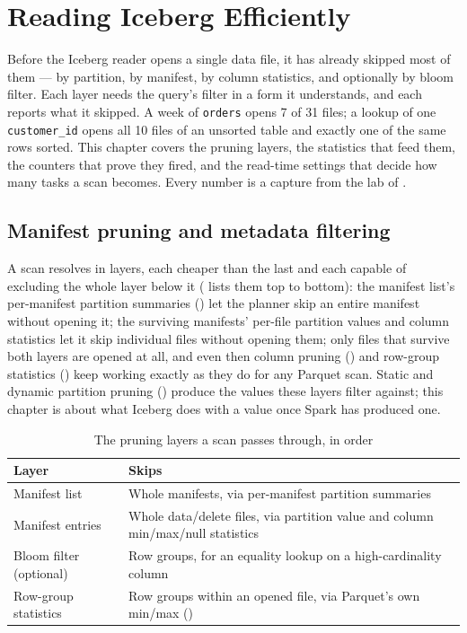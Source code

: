 \chapter{Reading Iceberg Efficiently}
\label{ch:iceberg-read}

\begin{chapterintro}
Before the Iceberg reader opens a single data file, it has already skipped most
of them --- by partition, by manifest, by column statistics, and optionally by
bloom filter. Each layer needs the query's filter in a form it understands, and
each reports what it skipped. A week of \texttt{orders} opens 7 of 31 files; a
lookup of one \texttt{customer\_id} opens all 10 files of an unsorted table and
exactly one of the same rows sorted. This chapter covers the pruning layers, the
statistics that feed them, the counters that prove they fired, and the read-time
settings that decide how many tasks a scan becomes. Every number is a capture
from the lab of .
\end{chapterintro}

\section{Manifest pruning and metadata filtering}
\label{sec:ice-read-manifest-pruning}

A scan resolves in layers, each cheaper than the last and each capable of
excluding the whole layer below it ( lists them top
to bottom): the manifest list's per-manifest partition summaries
() let the planner skip an entire manifest without opening
it; the surviving manifests' per-file partition values and column statistics let
it skip individual files without opening them; only files that survive both
layers are opened at all, and even then column pruning
() and row-group statistics () keep
working exactly as they do for any Parquet scan. Static and dynamic partition
pruning () produce the values these layers filter against; this
chapter is about what Iceberg does with a value once Spark has produced one.

\begin{table}[htbp]
\centering
\caption{The pruning layers a scan passes through, in order}
\label{tab:ice-pruning-layers}
\begin{tabular}{@{}lP{7.5cm}@{}}
\toprule
\textbf{Layer} & \textbf{Skips} \\
\midrule
Manifest list & Whole manifests, via per-manifest partition summaries \\
Manifest entries & Whole data/delete files, via partition value and column
  min/max/null statistics \\
Bloom filter (optional) & Row groups, for an equality lookup on a
  high-cardinality column \\
Row-group statistics & Row groups within an opened file, via Parquet's own
  min/max () \\
\bottomrule
\end{tabular}
\end{table}

